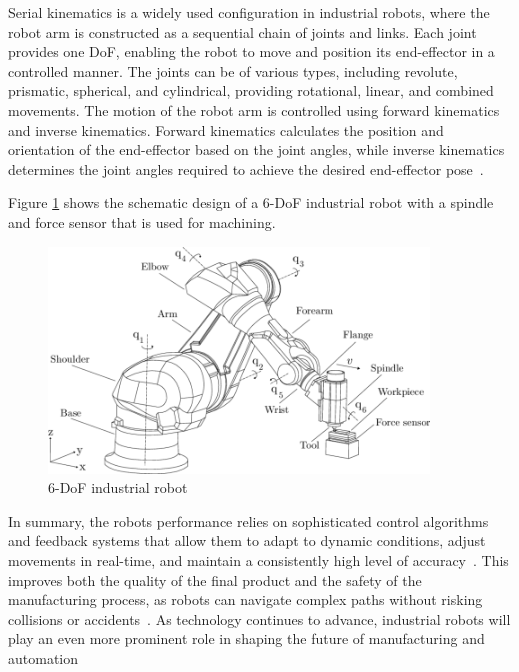 Serial kinematics is a widely used configuration in industrial robots, where the robot arm is constructed as a sequential chain of joints and links. Each joint provides one \acrshort{DoF}, enabling the robot to move and position its end-effector in a controlled manner. The joints can be of various types, including revolute, prismatic, spherical, and cylindrical, providing rotational, linear, and combined movements. The motion of the robot arm is controlled using forward kinematics and inverse kinematics. Forward kinematics calculates the position and orientation of the end-effector based on the joint angles, while inverse kinematics determines the joint angles required to achieve the desired end-effector pose~\cite{Singh.2021b}. %


Figure \ref{robot} shows the schematic design of a 6-\acrshort{DoF} industrial robot with a spindle and force sensor that is used for machining.

\begin{figure}[H]
	\centerline{\includegraphics[width=0.9\textwidth]{figures/robot.png}}
	\caption{6-DoF industrial robot~\cite{HuynhHoaiNam.2018}}
	\label{robot}
\end{figure}
\newpage
In summary, the robots performance relies on sophisticated control algorithms and feedback systems that allow them to adapt to dynamic conditions, adjust movements in real-time, and maintain a consistently high level of accuracy~\cite{Lin.2023}. This improves both the quality of the final product and the safety of the manufacturing process, as robots can navigate complex paths without risking collisions or accidents~\cite{Bosscher.2011}.
As technology continues to advance, industrial robots will play an even more prominent role in shaping the future of manufacturing and automation~\cite{Domae.2019}


